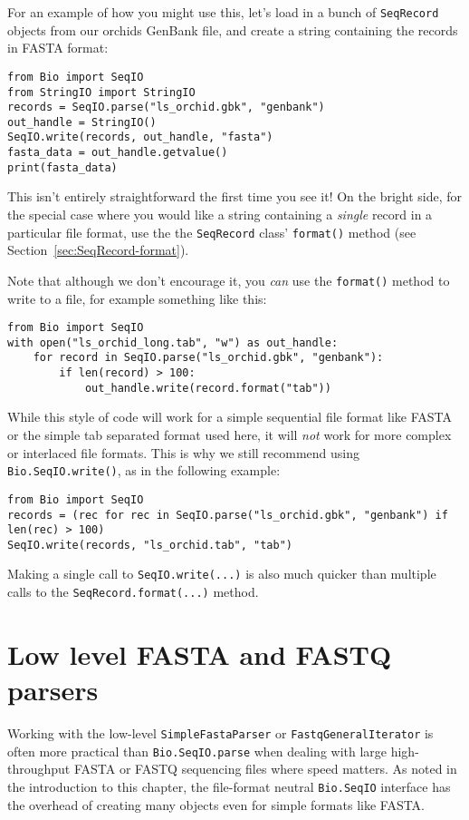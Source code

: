 For an example of how you might use this, let's load in a bunch of \verb|SeqRecord| objects from our orchids GenBank file, and create a string containing the records in FASTA format:

\begin{verbatim}
from Bio import SeqIO
from StringIO import StringIO
records = SeqIO.parse("ls_orchid.gbk", "genbank")
out_handle = StringIO()
SeqIO.write(records, out_handle, "fasta")
fasta_data = out_handle.getvalue()
print(fasta_data)
\end{verbatim}

This isn't entirely straightforward the first time you see it!  On the bright side, for the special case where you would like a string containing a \emph{single} record in a particular file format, use the the \verb|SeqRecord| class' \verb|format()| method (see Section~\ref{sec:SeqRecord-format}).

Note that although we don't encourage it, you \emph{can} use the \verb|format()| method to write to a file, for example something like this:
\begin{verbatim}
from Bio import SeqIO
with open("ls_orchid_long.tab", "w") as out_handle:
    for record in SeqIO.parse("ls_orchid.gbk", "genbank"):
        if len(record) > 100:
            out_handle.write(record.format("tab"))
\end{verbatim}
\noindent While this style of code will work for a simple sequential file format like FASTA or the simple tab separated format used here, it will \emph{not} work for more complex or interlaced file formats.  This is why we still recommend using \verb|Bio.SeqIO.write()|, as in the following example:
\begin{verbatim}
from Bio import SeqIO
records = (rec for rec in SeqIO.parse("ls_orchid.gbk", "genbank") if len(rec) > 100)
SeqIO.write(records, "ls_orchid.tab", "tab")
\end{verbatim}
\noindent Making a single call to \verb|SeqIO.write(...)| is also much quicker than
multiple calls to the \verb|SeqRecord.format(...)| method.

\section{Low level FASTA and FASTQ parsers}
\label{sec:low-level-fasta-fastq}

Working with the low-level \verb|SimpleFastaParser| or
\verb|FastqGeneralIterator| is often more practical than
\verb|Bio.SeqIO.parse| when dealing with large high-throughput FASTA
or FASTQ sequencing files where speed matters.
As noted in the introduction to this chapter, the file-format neutral
\verb|Bio.SeqIO| interface has the overhead of creating many objects
even for simple formats like FASTA.

